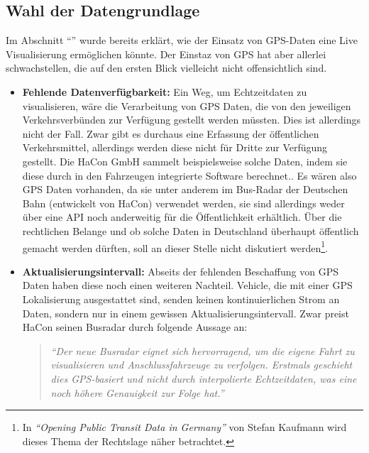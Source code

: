 \subsection{Wahl der Datengrundlage}
\label{ssub:wahl_der_datengrundlage}
  Im Abschnitt "`"' wurde bereits erklärt, wie der Einsatz von GPS-Daten eine Live Visualisierung ermöglichen könnte. Der Einstaz von GPS hat aber allerlei schwachstellen, die auf den ersten Blick vielleicht nicht offensichtlich sind.

  \begin{itemize}[label={}]
    \item \textbf{Fehlende Datenverfügbarkeit:}
      Ein Weg, um Echtzeitdaten zu visualisieren, wäre die Verarbeitung von GPS Daten, die von den jeweiligen Verkehrsverbünden zur Verfügung gestellt werden müssten. Dies ist allerdings nicht der Fall. Zwar gibt es durchaus eine Erfassung der öffentlichen Verkehrsmittel, allerdings werden diese nicht für Dritte zur Verfügung gestellt. Die HaCon GmbH sammelt beispielsweise solche Daten, indem sie diese durch in den Fahrzeugen integrierte Software berechnet.\parencite{havasBusradar}. Es wären also GPS Daten vorhanden, da sie unter anderem im Bus-Radar der Deutschen Bahn (entwickelt von HaCon) verwendet werden, sie sind allerdings weder über eine API noch anderweitig für die Öffentlichkeit erhältlich. Über die rechtlichen Belange und ob solche Daten in Deutschland überhaupt öffentlich gemacht werden dürften, soll an dieser Stelle nicht diskutiert werden\footnote{In \textit{"`Opening Public Transit Data in Germany"'} von Stefan Kaufmann\parencite{kaufmann} wird dieses Thema der Rechtslage näher betrachtet.}.

    \item \textbf{Aktualisierungsintervall:}
      Abseits der fehlenden Beschaffung von GPS Daten haben diese noch einen weiteren Nachteil. Vehicle, die mit einer GPS Lokalisierung ausgestattet sind, senden keinen kontinuierlichen Strom an Daten, sondern nur in einem gewissen Aktualisierungsintervall. Zwar preist HaCon seinen Busradar durch folgende Aussage an: 

      \begin{quote}
        \textit{"`Der neue Busradar eignet sich hervorragend, um die eigene Fahrt zu visualisieren und Anschlussfahrzeuge zu verfolgen. Erstmals geschieht dies GPS-basiert und nicht durch interpolierte Echtzeitdaten, was eine noch höhere Genauigkeit zur Folge hat."'}\parencite{havasBusradar}
      \end{quote}


\end{itemize}
